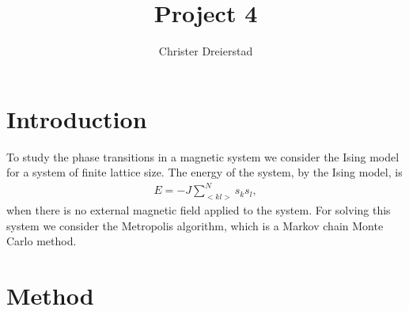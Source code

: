 \documentclass{emulateapj}
\begin{document}
\title{Project 4}

\author{Christer Dreierstad}





\begin{abstract}

\end{abstract}

\section{Introduction}
\label{sec:introduction}
To study the phase transitions in a magnetic system we consider the Ising model for a system of finite lattice size. The energy of the system, by the Ising model, is 
%
\begin{gather*}
    E = -J\sum_{< kl >}^N s_k s_l,
\end{gather*}
%
when there is no external magnetic field applied to the system. For solving this system we consider the Metropolis algorithm, which is a Markov chain Monte Carlo method. 

\section{Method}
\label{sec:method}
\end{document}
